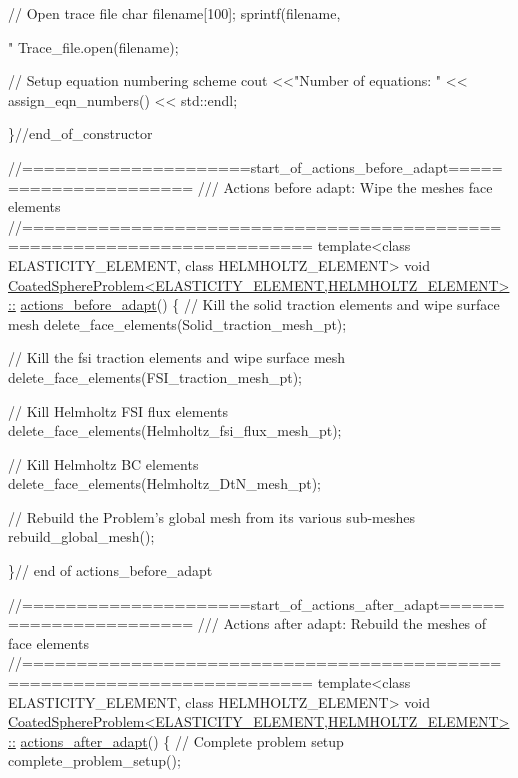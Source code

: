 \begin{DoxyCodeInclude}
 \textcolor{comment}{// Open trace file}
 \textcolor{keywordtype}{char} filename[100];
 sprintf(filename,\textcolor{stringliteral}{"%
 Trace\_file.open(filename);
  
 \textcolor{comment}{// Setup equation numbering scheme}
 cout <<\textcolor{stringliteral}{"Number of equations: "} << assign\_eqn\_numbers() << std::endl; 

\}\textcolor{comment}{//end\_of\_constructor}


\textcolor{comment}{//=====================start\_of\_actions\_before\_adapt======================}\textcolor{comment}{}
\textcolor{comment}{/// Actions before adapt: Wipe the meshes face elements}
\textcolor{comment}{}\textcolor{comment}{//========================================================================}
\textcolor{keyword}{template}<\textcolor{keyword}{class} ELASTICITY\_ELEMENT, \textcolor{keyword}{class} HELMHOLTZ\_ELEMENT>
\textcolor{keywordtype}{void} \hyperlink{classCoatedSphereProblem_a0cd5d4eea9d34eefd829f7539c41c998}{CoatedSphereProblem<ELASTICITY\_ELEMENT,HELMHOLTZ\_ELEMENT>::}
\hyperlink{classCoatedSphereProblem_a0cd5d4eea9d34eefd829f7539c41c998}{actions\_before\_adapt}()
\{
 \textcolor{comment}{// Kill the solid traction elements and wipe surface mesh}
 delete\_face\_elements(Solid\_traction\_mesh\_pt);

 \textcolor{comment}{// Kill the fsi traction elements and wipe surface mesh}
 delete\_face\_elements(FSI\_traction\_mesh\_pt);
 
 \textcolor{comment}{// Kill Helmholtz FSI flux elements}
 delete\_face\_elements(Helmholtz\_fsi\_flux\_mesh\_pt);
 
 \textcolor{comment}{// Kill Helmholtz BC elements }
 delete\_face\_elements(Helmholtz\_DtN\_mesh\_pt);
 
 \textcolor{comment}{// Rebuild the Problem's global mesh from its various sub-meshes}
 rebuild\_global\_mesh();

\}\textcolor{comment}{// end of actions\_before\_adapt}



\textcolor{comment}{//=====================start\_of\_actions\_after\_adapt=======================}\textcolor{comment}{}
\textcolor{comment}{///  Actions after adapt: Rebuild the meshes of face elements}
\textcolor{comment}{}\textcolor{comment}{//========================================================================}
\textcolor{keyword}{template}<\textcolor{keyword}{class} ELASTICITY\_ELEMENT, \textcolor{keyword}{class} HELMHOLTZ\_ELEMENT>
\textcolor{keywordtype}{void} \hyperlink{classCoatedSphereProblem_a77906dadd8ceb1d1d3182f298a0ca2d2}{CoatedSphereProblem<ELASTICITY\_ELEMENT,HELMHOLTZ\_ELEMENT>::}
\hyperlink{classCoatedSphereProblem_a77906dadd8ceb1d1d3182f298a0ca2d2}{actions\_after\_adapt}()
\{
 \textcolor{comment}{// Complete problem setup}
 complete\_problem\_setup(); 

}
\end{DoxyCodeInclude}
